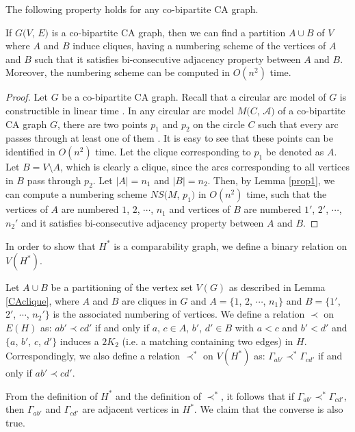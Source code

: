 The following property holds for any co-bipartite CA graph.
 \begin{lemma} \label{CAclique}
 If $G(V$, $E)$ is a co-bipartite CA graph, then we can find a partition $A\cup B$ of $V$ where $A$ and $B$ induce cliques, having a numbering scheme of the vertices of $A$ and $B$ such that it satisfies bi-consecutive adjacency property between $A$ and $B$. Moreover, the numbering scheme can be computed in $O(n^2)$ time. 
\end{lemma}
\begin{proof}
  Let $G$ be a co-bipartite CA graph. Recall that a circular arc model of $G$ is constructible in linear time \cite{Ross1}. In any circular arc model  $M(C$, $\mathcal{A})$ of a co-bipartite CA graph $G$, there are two points $p_1$ and $p_2$ on the circle $C$ such that every arc passes through at least one of them \cite{Tucker2,Lin09}. It is easy to see that these points can be identified in $O(n^2)$ time. Let the clique corresponding to $p_1$ be denoted as $A$. Let $B=V \setminus A$, which is clearly a clique, since the arcs corresponding to all vertices in $B$ pass through $p_2$. Let $|A|=n_1$ and $|B|=n_2$. Then, by Lemma \ref{prop1}, we can compute a numbering scheme $NS(M$, $p_1)$ in $O(n^2)$ time, such that the vertices of $A$ are numbered $1$, $2$, $\cdots$, $n_1$ and vertices of $B$ are numbered $1'$, $2'$, $\cdots$, $n_2'$ and it satisfies bi-consecutive adjacency property between $A$ and $B$. 
\end{proof}
In order to show that $H^*$ is a comparability graph, we define a binary relation on $V(H^*)$. 
\begin{definition}\label{defRelation}
  Let $A \cup B$ be a partitioning of the vertex set $V(G)$ as described in Lemma \ref{CAclique}, where $A$ and $B$ are cliques in $G$ and $A=\{1$, $2$, $\cdots$, $n_1\}$ and $B=\{1'$, $2'$, $\cdots$, $n_2'\}$ is the associated numbering of vertices. We define a relation $\prec$ on $E(H)$ as: $ ab' \prec cd'$ if and only if $a$, $c \in A$, $b'$, $d' \in B$ with $a < c$ and $b'< d'$ and $\{a$, $b'$, $c$, $d'\}$ induces a $2K_2$ (i.e. a matching containing two edges) in $H$. Correspondingly, we also define a relation $\prec^*$ on $V(H^*)$ as: $\Gamma_{ab'} \prec^* \Gamma_{cd'}$ if and only if $ab' \prec cd'$.
\end{definition}
 From the definition of $H^*$ and the definition of $\prec^*$, it follows that if $\Gamma_{ab'} \prec^* \Gamma_{cd'}$, then $\Gamma_{ab'}$ and $\Gamma_{cd'}$ are adjacent vertices in $H^*$. We claim that the converse is also true. 
